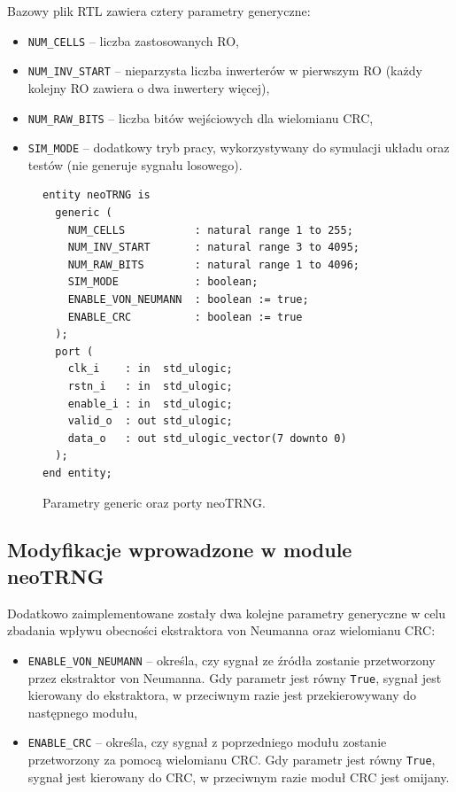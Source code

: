 Bazowy plik RTL zawiera cztery parametry generyczne:

\begin{itemize}
  \item \texttt{NUM\_CELLS} -- liczba zastosowanych RO,
  \item \texttt{NUM\_INV\_START} -- nieparzysta liczba inwerterów w pierwszym RO (każdy 
  kolejny RO zawiera o dwa inwertery więcej),
  \item \texttt{NUM\_RAW\_BITS} -- liczba bitów wejściowych dla wielomianu CRC,
  \item \texttt{SIM\_MODE} -- dodatkowy tryb pracy, wykorzystywany do symulacji układu 
  oraz testów (nie generuje sygnału losowego).
\end{itemize}

\begin{figure}[H]
    \centering
    \begin{verbatim}
entity neoTRNG is
  generic (
    NUM_CELLS           : natural range 1 to 255;
    NUM_INV_START       : natural range 3 to 4095;
    NUM_RAW_BITS        : natural range 1 to 4096;
    SIM_MODE            : boolean;
    ENABLE_VON_NEUMANN  : boolean := true;
    ENABLE_CRC          : boolean := true
  );
  port (
    clk_i    : in  std_ulogic;
    rstn_i   : in  std_ulogic;
    enable_i : in  std_ulogic;
    valid_o  : out std_ulogic;
    data_o   : out std_ulogic_vector(7 downto 0)
  );
end entity;
    \end{verbatim}
    \caption{Parametry generic oraz porty neoTRNG.}
    \label{fig:ch3_neotrng_entity_generic_port_map}
\end{figure}



\subsection{Modyfikacje wprowadzone w module neoTRNG}

\noindent Dodatkowo zaimplementowane zostały dwa kolejne parametry generyczne w celu 
zbadania wpływu obecności ekstraktora von Neumanna oraz wielomianu CRC: 

\begin{itemize}
  \item \texttt{ENABLE\_VON\_NEUMANN} -- określa, czy sygnał ze źródła zostanie przetworzony 
  przez ekstraktor von Neumanna. Gdy parametr jest równy \texttt{True}, sygnał jest 
  kierowany do ekstraktora, w przeciwnym razie jest przekierowywany do następnego modułu,
  \item \texttt{ENABLE\_CRC} -- określa, czy sygnał z poprzedniego modułu zostanie przetworzony 
  za pomocą wielomianu CRC. Gdy parametr jest równy \texttt{True}, sygnał jest kierowany do CRC, w 
  przeciwnym razie moduł CRC jest omijany.
\end{itemize}

